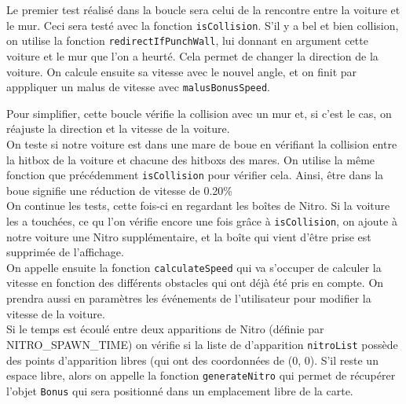 \documentclass[11pt, final]{report}
\renewcommand{\tt}[1]{\texttt{#1}}
\begin{document}


Le premier test réalisé dans la boucle sera celui de la rencontre entre la voiture et le mur. Ceci sera testé avec la fonction \tt{isCollision}. S'il y a bel et bien collision, on utilise la fonction \tt{redirectIfPunchWall}, lui donnant en argument cette voiture et le mur que l'on a heurté. Cela permet de changer la direction de la voiture. On calcule ensuite sa vitesse avec le nouvel angle, et on finit par apppliquer un malus de vitesse avec \tt{malusBonusSpeed}.

Pour simplifier, cette boucle vérifie la collision avec un mur et, si c'est le cas, on réajuste la direction et la vitesse de la voiture.
\\



On teste si notre voiture est dans une mare de boue en vérifiant la collision entre la hitbox de la voiture et chacune des hitboxs des mares. On utilise la même fonction que précédemment \tt{isCollision} pour vérifier cela. Ainsi, être dans la boue signifie une réduction de vitesse de 0.20\%
\\



On continue les tests, cette fois-ci en regardant les boîtes de Nitro. Si la voiture les a touchées, ce qu l'on vérifie encore une fois grâce à \tt{isCollision}, on ajoute à notre voiture une Nitro supplémentaire, et la boîte qui vient d'être prise est supprimée de l'affichage.
\\



On appelle ensuite la fonction \tt{calculateSpeed} qui va s'occuper de calculer la vitesse en fonction des différents obstacles qui ont déjà été pris en compte. On prendra aussi en paramètres les événements de l’utilisateur pour modifier la vitesse de la voiture.
\\



Si le temps est écoulé entre deux apparitions de Nitro (définie par NITRO\_SPAWN\_TIME) on vérifie si la liste de d'apparition \tt{nitroList} possède des points d'apparition libres (qui ont des coordonnées de (0, 0). S'il reste un espace libre, alors on appelle la fonction \tt{generateNitro} qui permet de récupérer l’objet \tt{Bonus} qui sera positionné dans un emplacement libre de la carte.
\end{document}
